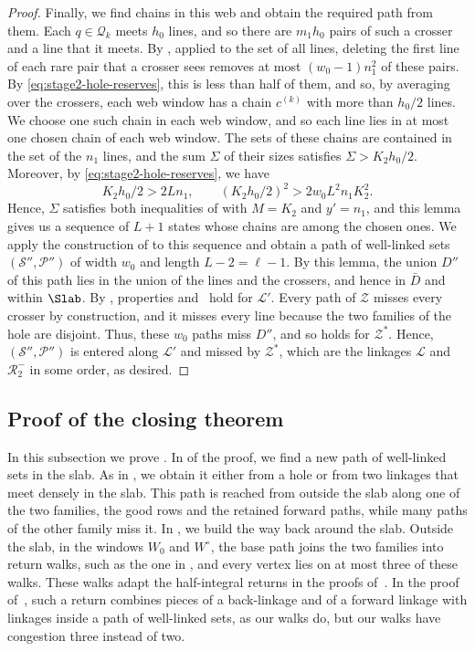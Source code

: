 \documentclass[fontsize=12pt,leading=14pt]{fullpaper}
\newcommand{\Lcal}{\mathcal{L}}
\newcommand{\Pcal}{\mathcal{P}}
\newcommand{\Qcal}{\mathcal{Q}}
\newcommand{\Rcal}{\mathcal{R}}
\newcommand{\Scal}{\mathcal{S}}
\newcommand{\Zcal}{\mathcal{Z}}
\newcounter{step}
\begin{document}
\begin{proof}
  Finally, we find chains in this web and obtain the required path from them.
  Each $q\in\Qcal_k$ meets $h_0$ lines, and so there are $m_1h_0$ pairs of such a crosser and a line that it meets.
  By , applied to the set of all lines, deleting the first line of each rare pair that a crosser sees removes at most $(w_0-1)n_1^2$ of these pairs.
  By \eqref{eq:stage2-hole-reserves}, this is less than half of them, and so, by averaging over the crossers, each web window has a chain $c^{(k)}$ with more than $h_0/2$ lines.
  We choose one such chain in each web window, and so each line lies in at most one chosen chain of each web window.
  The sets of these chains are contained in the set of the $n_1$ lines, and the sum $\Sigma$ of their sizes satisfies $\Sigma>K_2h_0/2$.
  Moreover, by \eqref{eq:stage2-hole-reserves}, we have
  \[
    K_2h_0/2>2Ln_1,\qquad (K_2h_0/2)^2>2w_0L^2n_1K_2^2.
  \]
  Hence, $\Sigma$ satisfies both inequalities of  with $M=K_2$ and $y'=n_1$, and this lemma gives us a sequence of $L+1$ states whose chains are among the chosen ones.
  We apply the construction of  to this sequence and obtain a path of well-linked sets $(\Scal'',\Pcal'')$ of width $w_0$ and length $L-2=\ell-1$.
  By this lemma, the union $D''$ of this path lies in the union of the lines and the crossers, and hence in $\bar D$ and within $\Slab$.
  By , properties  and~ hold for $\Lcal'$.
  Every path of $\Zcal$ misses every crosser by construction, and it misses every line because the two families of the hole are disjoint.
  Thus, these $w_0$ paths miss $D''$, and so  holds for $\Zcal^*$.
  Hence, $(\Scal'',\Pcal'')$ is entered along $\Lcal'$ and missed by $\Zcal^*$, which are the linkages $\Lcal$ and $\Rcal_2^-$ in some order, as desired.
\end{proof}

\subsection{Proof of the closing theorem}\label{sec:stage2-proof}

In this subsection we prove .
In  of the proof, we find a new path of well-linked sets in the slab.
As in , we obtain it either from a hole or from two linkages that meet densely in the slab.
This path is reached from outside the slab along one of the two families, the good rows and the retained forward paths, while many paths of the other family miss it.
In , we build the way back around the slab.
Outside the slab, in the windows $W_0$ and $W^\circ$, the base path joins the two families into return walks, such as the one in , and every vertex lies on at most three of these walks.
These walks adapt the half-integral returns in the proofs of~\cite[lemmas~4.10 and~5.10]{HKMM26b}.
In the proof of~\cite[Lemma~4.10]{HKMM26b}, such a return combines pieces of a back-linkage and of a forward linkage with linkages inside a path of well-linked sets, as our walks do, but our walks have congestion three instead of two.
\end{document}
